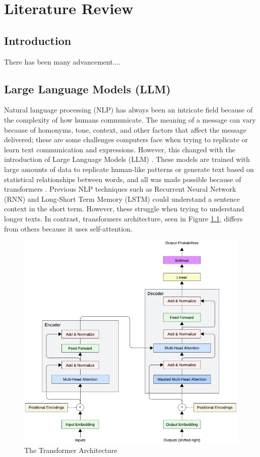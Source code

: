 

\chapter{Literature Review}  

\section{Introduction}
There has been many advancement....


\section{Large Language Models (LLM)}
Natural language processing (NLP) has always been an intricate field because of the complexity of how humans communicate. The meaning of a message
can vary because of homonyms, tone, context, and other factors that affect the message delivered; these are some challenges computers face when trying
to replicate or learn text communication and expressions.  However, this changed with the introduction of Large Language Models (LLM) \cite{naveed2024comprehensiveoverviewlargelanguage}.
These models are trained with large amounts of data to replicate human-like patterns or generate text based on statistical relationships between words, and all
was made possible because of transformers \cite{vaswani2023attentionneed}. Previous NLP techniques such as Recurrent Neural Network (RNN) and
Long-Short Term Memory (LSTM) could understand a sentence context in the short term. However, these struggle when trying to understand longer texts.
In contrast, transformers architecture, seen in Figure \ref{transformer}, differs from others because it uses self-attention.

\begin{figure}[!hb]
    \centering
        \includegraphics[width=1\linewidth]{images/transformers_architecture.png}
        \caption{The Transformer Architecture}
        \label{transformer}
\end{figure}


